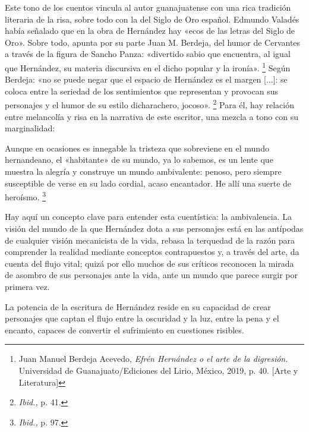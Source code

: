 \documentclass[14pt,twoside,final]{extbook} %
\let\oldfootnote\footnote
\renewcommand\footnote[1]{%
\oldfootnote{\hspace{1mm}#1}}
\begin{document}
Este tono de los cuentos vincula al autor guanajuatense con una rica tradición literaria de la risa, sobre todo con la del Siglo de Oro español. Edmundo Valadés había señalado que en la obra de Hernández hay «ecos de las letras del Siglo de Oro». Sobre todo, apunta por su parte Juan M. Berdeja, del humor de Cervantes a través de la figura de Sancho Panza: «divertido sabio que encuentra, al igual que Hernández, su materia discursiva en el dicho popular y la ironía».\footnote{Juan Manuel Berdeja Acevedo, \emph{Efrén Hernández o el arte de la digresión.} Universidad de Guanajuato/Ediciones del Lirio, México, 2019, p. 40. [Arte y Literatura]} Según Berdeja: «no se puede negar que el espacio de Hernández es el margen [...]: se coloca entre la seriedad de los sentimientos que representan y provocan sus personajes y el humor de su estilo dicharachero, jocoso».\footnote{\emph{Ibid.,} p. 41.} Para él, hay relación entre melancolía y risa en la narrativa de este escritor, una mezcla a tono con su marginalidad:
\begin{quoting}
Aunque en ocasiones es innegable la tristeza que sobreviene en el mundo hernandeano, el «habitante» de su mundo, ya lo sabemos, es un lente que muestra la alegría y construye un mundo ambivalente: penoso, pero siempre susceptible de verse en su lado cordial, acaso encantador. He allí una suerte de heroísmo.\footnote{\emph{Ibid.,} p. 97.}
\end{quoting}
Hay aquí un concepto clave para entender esta cuentística: la ambivalencia. La visión del mundo de la que Hernández dota a sus personajes está en las antípodas de cualquier visión mecanicista de la vida, rebasa la terquedad de la razón para comprender la realidad mediante conceptos contrapuestos y, a través del arte, da cuenta del flujo vital; quizá por ello muchos de sus críticos reconocen la mirada de asombro de sus personajes ante la vida, ante un mundo que parece surgir por primera vez.

La potencia de la escritura de Hernández reside en su capacidad de crear personajes que captan el flujo entre la oscuridad y la luz, entre la pena y el encanto, capaces de convertir el sufrimiento en cuestiones risibles.
\end{document}
